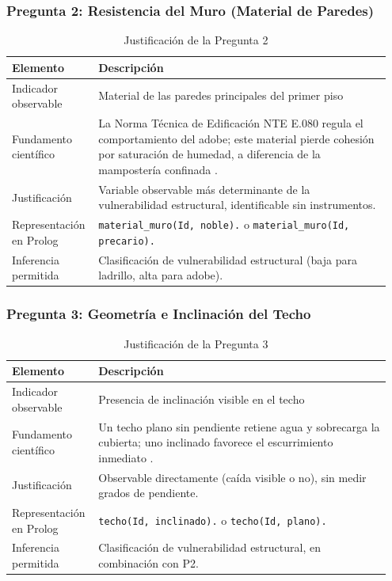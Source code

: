 \documentclass[12pt, letterpaper]{article}
\begin{document}
\subsubsection*{Pregunta 2: Resistencia del Muro (Material de Paredes)}
\begin{table}[H]
\centering
\caption{Justificación de la Pregunta 2}
\label{tab:p2}
\begin{tabular}{@{}p{0.2\linewidth}p{0.75\linewidth}@{}}
\toprule
\textbf{Elemento} & \textbf{Descripción} \\ \midrule
Indicador observable & Material de las paredes principales del primer piso \\
Fundamento científico & La Norma Técnica de Edificación NTE E.080 regula el comportamiento del adobe; este material pierde cohesión por saturación de humedad, a diferencia de la mampostería confinada \parencite{min_vivienda_rne}. \\
Justificación & Variable observable más determinante de la vulnerabilidad estructural, identificable sin instrumentos. \\
Representación en Prolog & \texttt{material\_muro(Id, noble).} o \texttt{material\_muro(Id, precario).} \\
Inferencia permitida & Clasificación de vulnerabilidad estructural (baja para ladrillo, alta para adobe). \\ \bottomrule
\end{tabular}
\end{table}

\subsubsection*{Pregunta 3: Geometría e Inclinación del Techo}
\begin{table}[H]
\centering
\caption{Justificación de la Pregunta 3}
\label{tab:p3}
\begin{tabular}{@{}p{0.2\linewidth}p{0.75\linewidth}@{}}
\toprule
\textbf{Elemento} & \textbf{Descripción} \\ \midrule
Indicador observable & Presencia de inclinación visible en el techo \\
Fundamento científico & Un techo plano sin pendiente retiene agua y sobrecarga la cubierta; uno inclinado favorece el escurrimiento inmediato \parencite{typsa_drenaje}. \\
Justificación & Observable directamente (caída visible o no), sin medir grados de pendiente. \\
Representación en Prolog & \texttt{techo(Id, inclinado).} o \texttt{techo(Id, plano).} \\
Inferencia permitida & Clasificación de vulnerabilidad estructural, en combinación con P2. \\ \bottomrule
\end{tabular}
\end{table}
\end{document}
